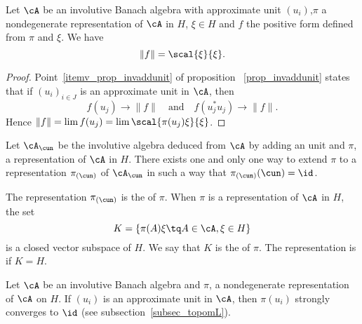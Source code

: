 \begin{proposition}
	Let $\cA$ be an involutive Banach algebra with approximate unit $(u_i)$,$\pi$ a nondegenerate representation of $\cA$ in $H$, $\xi\in H$ and $f$ the positive form defined from $\pi$ and $\xi$. We have
	\begin{equation}
		\| f \|=\scal{ \xi }{ \xi }.
	\end{equation}
\end{proposition}

\begin{proof}
	Point~\ref{itemv_prop_invaddunit} of proposition ~\ref{prop_invaddunit} states that if $(u_i)_{i\in J}$ is an approximate unit in $\cA$, then
	\[
		f(u_j)\to\| f \|\quad\text{and}\quad f(u_j^*u_j)\to \| f \|.
	\]
	Hence $\| f \|=\lim f(u_j)=\lim\scal{ \pi(u_j)\xi }{ \xi }$.

\end{proof}

\begin{proposition}
	Let $\cA_{\cun}$ be the involutive algebra deduced from $\cA$ by adding an unit and $\pi$, a representation of $\cA$ in $H$. There exists one and only one way to extend $\pi$ to a representation $\pi_{(\cun)}$ of $\cA_{\cun}$ in such a way that $\pi_{(\cun)}(\cun)=\id$.
\end{proposition}
The representation $\pi_{(\cun)}$ is the  of $\pi$. When $\pi$ is a representation of $\cA$ in $H$, the set
\begin{equation}
	K=\{ \pi(A)\xi\tq A\in\cA,\xi\in H \}
\end{equation}
is a closed vector subspace of $H$. We say that $K$ is the  of $\pi$. The representation is  if $K=H$.

\begin{proposition}
	Let $\cA$ be an involutive Banach algebra and $\pi$, a nondegenerate representation of $\cA$ on $H$. If $(u_i)$ is an approximate unit in $\cA$, then $\pi(u_i)$ strongly converges to $\id$ (see subsection~\ref{subsec_topomL}).
\end{proposition}

